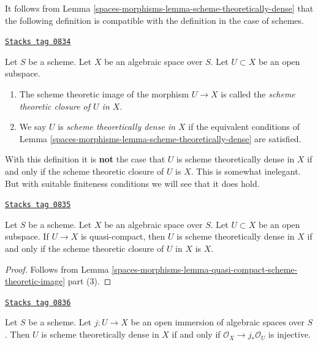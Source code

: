 It follows from
Lemma \ref{spaces-morphisms-lemma-scheme-theoretically-dense}
that the following definition is compatible with the definition
in the case of schemes.

\begin{definition}
\label{spaces-morphisms-definition-scheme-theoretically-dense}
\href{https://stacks.math.columbia.edu/tag/0834}{\texttt{Stacks tag 0834}}

Let $S$ be a scheme.
Let $X$ be an algebraic space over $S$.
Let $U \subset X$ be an open subspace.
\begin{enumerate}
\item The scheme theoretic image of the morphism $U \to X$
is called the {\it scheme theoretic closure of $U$ in $X$}.
\item We say $U$ is {\it scheme theoretically dense in $X$}
if the equivalent conditions of
Lemma \ref{spaces-morphisms-lemma-scheme-theoretically-dense} are satisfied.
\end{enumerate}
\end{definition}

With this definition it is {\bf not} the case that $U$ is scheme
theoretically dense in $X$ if and only if the scheme theoretic closure
of $U$ is $X$. This is somewhat inelegant. But with suitable
finiteness conditions we will see that it does hold.

\begin{lemma}
\label{spaces-morphisms-lemma-scheme-theoretically-dense-quasi-compact}
\href{https://stacks.math.columbia.edu/tag/0835}{\texttt{Stacks tag 0835}}

Let $S$ be a scheme. Let $X$ be an algebraic space over $S$.
Let $U \subset X$ be an open subspace.
If $U \to X$ is quasi-compact, then $U$
is scheme theoretically dense in $X$ if and only if the scheme theoretic
closure of $U$ in $X$ is $X$.
\end{lemma}

\begin{proof}
Follows from Lemma \ref{spaces-morphisms-lemma-quasi-compact-scheme-theoretic-image} part (3).
\end{proof}

\begin{lemma}
\label{spaces-morphisms-lemma-characterize-scheme-theoretically-dense}
\href{https://stacks.math.columbia.edu/tag/0836}{\texttt{Stacks tag 0836}}

Let $S$ be a scheme.
Let $j : U \to X$ be an open immersion of algebraic spaces over $S$.
Then $U$ is scheme theoretically dense in $X$ if and only if
$\mathcal{O}_X \to j_*\mathcal{O}_U$ is injective.
\end{lemma}

